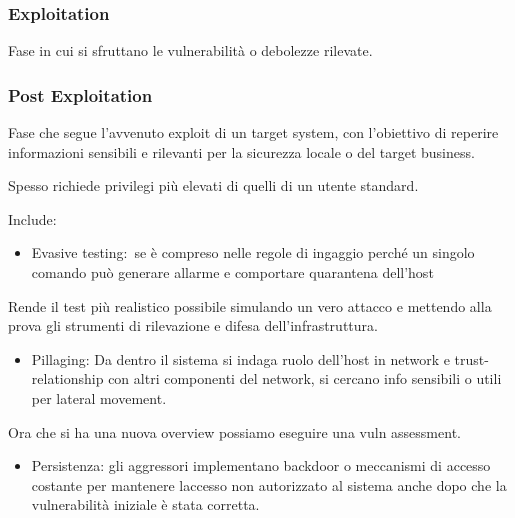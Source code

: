 \documentclass[
]{article}
\providecommand{\tightlist}{%
  \setlength{\itemsep}{0pt}\setlength{\parskip}{0pt}}
\begin{document}
\subsubsection{\texorpdfstring{{Exploitation}}{Exploitation}}\label{h.anl7zbx3l3q0}

{Fase in cui si sfruttano le vulnerabilità o debolezze rilevate. }

\subsubsection{\texorpdfstring{{Post
Exploitation}}{Post Exploitation}}\label{h.jm60nhoz6vhc}

{Fase che segue l'avvenuto exploit di un target system, con l'obiettivo
di reperire informazioni sensibili e rilevanti per la sicurezza locale o
del target business. }

{}

{Spesso richiede privilegi più elevati di quelli di un utente standard.
}

{Include:}

\begin{itemize}
\tightlist
\item
  {Evasive testing:}{~se è compreso nelle regole di ingaggio perché un
  singolo comando può generare allarme e comportare quarantena
  dell'host}
\end{itemize}

{Rende il test più realistico possibile simulando un vero attacco e
mettendo alla prova gli strumenti di rilevazione e difesa
dell'infrastruttura.}

{}

\begin{itemize}
\tightlist
\item
  {Pillaging}{: Da dentro il sistema si indaga ruolo dell'host in
  network e trust-relationship con altri componenti del network, si
  cercano info sensibili o utili per lateral movement.}
\end{itemize}

{Ora che si ha una nuova overview possiamo eseguire una }{vuln
assessment.}

{}

\begin{itemize}
\tightlist
\item
  {Persistenza}{: gli aggressori implementano backdoor o meccanismi di
  accesso costante per mantenere l\textquotesingle accesso non
  autorizzato al sistema anche dopo che la vulnerabilità iniziale è
  stata corretta.}
\end{itemize}
\end{document}
